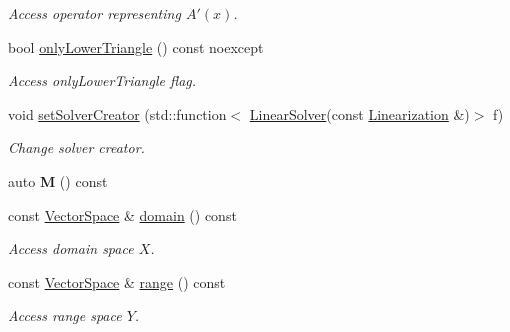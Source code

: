 \begin{DoxyCompactItemize}
\begin{DoxyCompactList}\small\item\em Access operator representing $A'(x)$. \end{DoxyCompactList}\item 
bool \hyperlink{classSpacy_1_1Kaskade_1_1DynamicC1Operator_a790124ad6b035750e819cdc0718e9af3}{only\-Lower\-Triangle} () const noexcept
\begin{DoxyCompactList}\small\item\em Access only\-Lower\-Triangle flag. \end{DoxyCompactList}\item 
void \hyperlink{classSpacy_1_1Kaskade_1_1DynamicC1Operator_a4a440be1a20133c2d7cb8c6382656172}{set\-Solver\-Creator} (std\-::function$<$ \hyperlink{namespaceSpacy_adcd0d78166a9c972b8a2e5a689fc2d03}{Linear\-Solver}(const \hyperlink{classSpacy_1_1Kaskade_1_1LinearOperator}{Linearization} \&)$>$ f)
\begin{DoxyCompactList}\small\item\em Change solver creator. \end{DoxyCompactList}\item 
\hypertarget{classSpacy_1_1Kaskade_1_1DynamicC1Operator_a197de5e4e1bfbdd4759be55afcdb8090}{auto {\bfseries M} () const }\label{classSpacy_1_1Kaskade_1_1DynamicC1Operator_a197de5e4e1bfbdd4759be55afcdb8090}

\item 
\hypertarget{classSpacy_1_1OperatorBase_a2588f9b3e0188820c4c494e63293dc6f}{const \hyperlink{classSpacy_1_1VectorSpace}{Vector\-Space} \& \hyperlink{classSpacy_1_1OperatorBase_a2588f9b3e0188820c4c494e63293dc6f}{domain} () const }\label{classSpacy_1_1OperatorBase_a2588f9b3e0188820c4c494e63293dc6f}

\begin{DoxyCompactList}\small\item\em Access domain space $X$. \end{DoxyCompactList}\item 
\hypertarget{classSpacy_1_1OperatorBase_ab19d3b7a6f290b1079248f1e567e53d6}{const \hyperlink{classSpacy_1_1VectorSpace}{Vector\-Space} \& \hyperlink{classSpacy_1_1OperatorBase_ab19d3b7a6f290b1079248f1e567e53d6}{range} () const }\label{classSpacy_1_1OperatorBase_ab19d3b7a6f290b1079248f1e567e53d6}

\begin{DoxyCompactList}\small\item\em Access range space $Y$. \end{DoxyCompactList}\end{DoxyCompactItemize}

